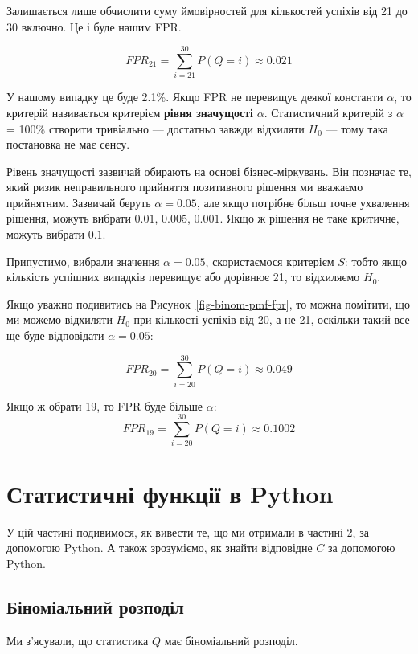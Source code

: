 \documentclass[
  letterpaper,
  10pt,
  openany]{report}
\theoremstyle{definition}
\theoremstyle{remark}
\begin{document}
Залишається лише обчислити суму ймовірностей для кількостей успіхів від
21 до 30 включно. Це і буде нашим FPR.

\[
FPR_{21} = \sum_{i = 21}^{30} P(Q = i) \approx 0.021
\]

У нашому випадку це буде 2.1\%. Якщо FPR не перевищує деякої константи
\(\alpha\), то критерій називається критерієм \textbf{рівня значущості}
\(\alpha\). Статистичний критерій з \(\alpha\) = 100\% створити
тривіально --- достатньо завжди відхиляти \(H_0\) --- тому така
постановка не має сенсу.

Рівень значущості зазвичай обирають на основі бізнес-міркувань. Він
позначає те, який ризик неправильного прийняття позитивного рішення ми
вважаємо прийнятним. Зазвичай беруть \(\alpha = 0.05\), але якщо
потрібне більш точне ухвалення рішення, можуть вибрати \(0.01\),
\(0.005\), \(0.001\). Якщо ж рішення не таке критичне, можуть вибрати
\(0.1\).

Припустимо, вибрали значення \(\alpha = 0.05\), скористаємося критерієм
\(S\): тобто якщо кількість успішних випадків перевищує або дорівнює 21,
то відхиляємо \(H_0\).

Якщо уважно подивитись на Рисунок~\ref{fig-binom-pmf-fpr}, то можна
помітити, що ми можемо відхиляти \(H_0\) при кількості успіхів від 20, а
не 21, оскільки такий все ще буде відповідати \(\alpha = 0.05\):

\[
FPR_{20} = \sum_{i = 20}^{30} P(Q = i) \approx 0.049
\]

Якщо ж обрати 19, то FPR буде більше \(\alpha\): \[
FPR_{19} = \sum_{i = 20}^{30} P(Q = i) \approx 0.1002
\]

\section{Статистичні функції в
Python}\label{ux441ux442ux430ux442ux438ux441ux442ux438ux447ux43dux456-ux444ux443ux43dux43aux446ux456ux457-ux432-python}

У цій частині подивимося, як вивести те, що ми отримали в частині 2, за
допомогою Python. А також зрозуміємо, як знайти відповідне \(C\) за
допомогою Python.

\subsection{Біноміальний
розподіл}\label{ux431ux456ux43dux43eux43cux456ux430ux43bux44cux43dux438ux439-ux440ux43eux437ux43fux43eux434ux456ux43b}

Ми з'ясували, що статистика \(Q\) має біноміальний розподіл.
\end{document}
